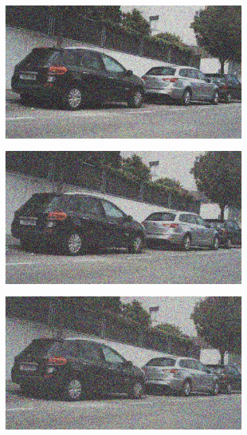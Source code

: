 \documentclass[a4paper]{ctexart}
\begin{document}
\begin{figure}[htbp]
\begin{subfigure}{0.08\textwidth}
				\label{fig：Gamma=0.5, Gauss Noise = 0.4}
			\end{subfigure}
			\begin{subfigure}{0.08\textwidth}
				\captionsetup{font=scriptsize}
				\includegraphics[width=\linewidth]{picture/Edge Detection/degrade/RGB_001 Gamma=0.5, Gauss Noise=0.5}
				\label{fig：Gamma=0.5, Gauss Noise = 0.5}
			\end{subfigure}
			\begin{subfigure}{0.08\textwidth}
				\captionsetup{font=scriptsize}
				\includegraphics[width=\linewidth]{picture/Edge Detection/degrade/RGB_001 Gamma=0.5, Gauss Noise=0.6}
				\label{fig：Gamma=0.5, Gauss Noise = 0.6}
			\end{subfigure}
			\begin{subfigure}{0.08\textwidth}
				\captionsetup{font=scriptsize}
				\includegraphics[width=\linewidth]{picture/Edge Detection/degrade/RGB_001 Gamma=0.5, Gauss Noise=0.7}

\end{subfigure}
\end{figure}
\end{document}
